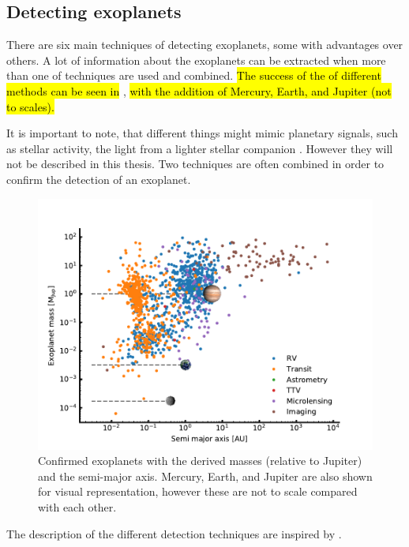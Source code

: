 \subsection{Detecting exoplanets}
\label{sec:detecting_exoplanets}

There are six main techniques of detecting exoplanets, some with advantages over others. A lot of
information about the exoplanets can be extracted when more than one of techniques are used and
combined. \hl{The success of the of different methods can be seen in} ,
\hl{with the addition of Mercury, Earth, and Jupiter (not to scales).}

It is important to note, that different things might mimic planetary signals, such as stellar
activity, the light from a lighter stellar companion \citep[see e.g.][]{Oshagh2013,Oshagh2014}.
However they will not be described in this thesis. Two techniques are often combined in order to
confirm the detection of an exoplanet.
\begin{figure}[htpb!]
    \centering
    \includegraphics[width=1.0\linewidth]{figures/exoplanetDetectionType.pdf}
    \caption{Confirmed exoplanets with the derived masses (relative to Jupiter) and the semi-major
             axis. Mercury, Earth, and Jupiter are also shown for visual representation, however
             these are not to scale compared with each other.}
    \label{fig:detectionTypes}
\end{figure}

The description of the different detection techniques are inspired by \citet{Seager2010}.


